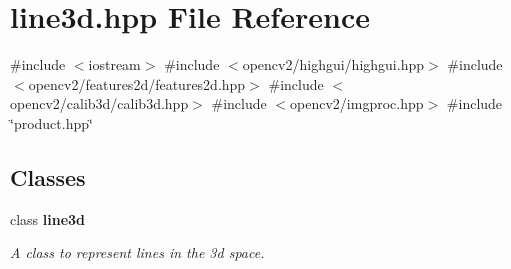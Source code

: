 \section{line3d.\+hpp File Reference}
\label{line3d_8hpp}
{\ttfamily \#include $<$iostream$>$}\newline
{\ttfamily \#include $<$opencv2/highgui/highgui.\+hpp$>$}\newline
{\ttfamily \#include $<$opencv2/features2d/features2d.\+hpp$>$}\newline
{\ttfamily \#include $<$opencv2/calib3d/calib3d.\+hpp$>$}\newline
{\ttfamily \#include $<$opencv2/imgproc.\+hpp$>$}\newline
{\ttfamily \#include \char`\"{}product.\+hpp\char`\"{}}\newline
\subsection*{Classes}
\begin{DoxyCompactItemize}
\item 
class \textbf{ line3d}
\begin{DoxyCompactList}\small\item\em A class to represent lines in the 3d space. \end{DoxyCompactList}\end{DoxyCompactItemize}
